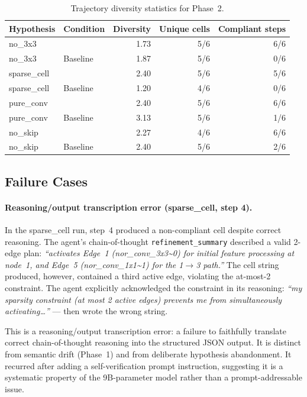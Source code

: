 \begin{table}[t]
\caption{Trajectory diversity statistics for Phase~2.}
\label{tab:diversity}
\begin{center}
\small
\begin{tabular}{llrrr}
\toprule
\textbf{Hypothesis} & \textbf{Condition} & \textbf{Diversity} &
                      \textbf{Unique cells} & \textbf{Compliant steps} \\
\midrule
no\_3x3      & \haas{}   & 1.73 & 5/6 & 6/6 \\
no\_3x3      & Baseline  & 1.87 & 5/6 & 0/6 \\
sparse\_cell & \haas{}   & 2.40 & 5/6 & 5/6 \\
sparse\_cell & Baseline  & 1.20 & 4/6 & 0/6 \\
pure\_conv   & \haas{}   & 2.40 & 5/6 & 6/6 \\
pure\_conv   & Baseline  & 3.13 & 5/6 & 1/6 \\
no\_skip     & \haas{}   & 2.27 & 4/6 & 6/6 \\
no\_skip     & Baseline  & 2.40 & 5/6 & 2/6 \\
\bottomrule
\end{tabular}
\end{center}
\end{table}

\subsection{Failure Cases}
\label{sec:phase2-failures}

\paragraph{Reasoning/output transcription error (sparse\_cell, step 4).}
In the sparse\_cell \haas{} run, step~4 produced a non-compliant cell
despite correct reasoning. The agent's chain-of-thought \texttt{refinement\_summary}
described a valid 2-edge plan: \emph{``activates Edge~1 (nor\_conv\_3x3\textasciitilde0)
for initial feature processing at node~1, and Edge~5 (nor\_conv\_1x1\textasciitilde1)
for the 1$\to$3 path.''} The cell string produced, however, contained a third
active edge, violating the at-most-2 constraint. The agent explicitly
acknowledged the constraint in its reasoning: \emph{``my sparsity constraint
(at most 2 active edges) prevents me from simultaneously activating\ldots''} ---
then wrote the wrong string.

This is a reasoning/output transcription error: a failure to faithfully
translate correct chain-of-thought reasoning into the structured JSON output.
It is distinct from semantic drift (Phase~1) and from deliberate hypothesis
abandonment. It recurred after adding a self-verification prompt instruction,
suggesting it is a systematic property of the 9B-parameter model rather than
a prompt-addressable issue.

